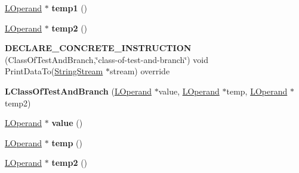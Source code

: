 \begin{DoxyCompactItemize}
\item 
\hyperlink{classv8_1_1internal_1_1_l_operand}{L\+Operand} $\ast$ {\bfseries temp1} ()\hypertarget{classv8_1_1internal_1_1_l_class_of_test_and_branch_a0b2bfcf011d3c151ca64ddaf7b1b1e24}{}\label{classv8_1_1internal_1_1_l_class_of_test_and_branch_a0b2bfcf011d3c151ca64ddaf7b1b1e24}

\item 
\hyperlink{classv8_1_1internal_1_1_l_operand}{L\+Operand} $\ast$ {\bfseries temp2} ()\hypertarget{classv8_1_1internal_1_1_l_class_of_test_and_branch_af359fb93d557818c0be046f117352321}{}\label{classv8_1_1internal_1_1_l_class_of_test_and_branch_af359fb93d557818c0be046f117352321}

\item 
{\bfseries D\+E\+C\+L\+A\+R\+E\+\_\+\+C\+O\+N\+C\+R\+E\+T\+E\+\_\+\+I\+N\+S\+T\+R\+U\+C\+T\+I\+ON} (Class\+Of\+Test\+And\+Branch,\char`\"{}class-\/of-\/test-\/and-\/branch\char`\"{}) void Print\+Data\+To(\hyperlink{classv8_1_1internal_1_1_string_stream}{String\+Stream} $\ast$stream) override\hypertarget{classv8_1_1internal_1_1_l_class_of_test_and_branch_a029c33ea762efee5c0e2f13b702a3b6f}{}\label{classv8_1_1internal_1_1_l_class_of_test_and_branch_a029c33ea762efee5c0e2f13b702a3b6f}

\item 
{\bfseries L\+Class\+Of\+Test\+And\+Branch} (\hyperlink{classv8_1_1internal_1_1_l_operand}{L\+Operand} $\ast$value, \hyperlink{classv8_1_1internal_1_1_l_operand}{L\+Operand} $\ast$temp, \hyperlink{classv8_1_1internal_1_1_l_operand}{L\+Operand} $\ast$temp2)\hypertarget{classv8_1_1internal_1_1_l_class_of_test_and_branch_a2382ed2b11f09f3de3e6fa9741e0c7f3}{}\label{classv8_1_1internal_1_1_l_class_of_test_and_branch_a2382ed2b11f09f3de3e6fa9741e0c7f3}

\item 
\hyperlink{classv8_1_1internal_1_1_l_operand}{L\+Operand} $\ast$ {\bfseries value} ()\hypertarget{classv8_1_1internal_1_1_l_class_of_test_and_branch_a701d1d88a41fd46c94cc2d33ec5093b6}{}\label{classv8_1_1internal_1_1_l_class_of_test_and_branch_a701d1d88a41fd46c94cc2d33ec5093b6}

\item 
\hyperlink{classv8_1_1internal_1_1_l_operand}{L\+Operand} $\ast$ {\bfseries temp} ()\hypertarget{classv8_1_1internal_1_1_l_class_of_test_and_branch_ad6879400ca43794c61f3e6ac2829ddab}{}\label{classv8_1_1internal_1_1_l_class_of_test_and_branch_ad6879400ca43794c61f3e6ac2829ddab}

\item 
\hyperlink{classv8_1_1internal_1_1_l_operand}{L\+Operand} $\ast$ {\bfseries temp2} ()\hypertarget{classv8_1_1internal_1_1_l_class_of_test_and_branch_af359fb93d557818c0be046f117352321}{}\label{classv8_1_1internal_1_1_l_class_of_test_and_branch_af359fb93d557818c0be046f117352321}


\end{DoxyCompactItemize}
